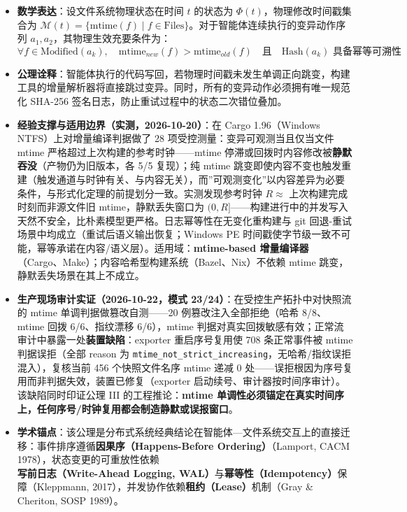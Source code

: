 \begin{itemize}
\tightlist
\item
  \textbf{数学表达}：设文件系统物理状态在时间 \(t\) 的状态为
  \(\Phi(t)\)，物理修改时间戳集合为
  \(\mathcal{M}(t) = \{ \text{mtime}(f) \mid f \in \text{Files} \}\)。对于智能体连续执行的变异动作序列
  \(a_1, a_2\)，其物理生效充要条件为：
  \[ \forall f \in \text{Modified}(a_k), \quad \text{mtime}_{new}(f) > \text{mtime}_{old}(f) \quad \text{且} \quad \text{Hash}(a_k) \text{ 具备幂等可溯性} \]
\item
  \textbf{公理诠释}：智能体执行的代码写回，若物理时间戳未发生单调正向跳变，构建工具的增量解析器将直接跳过变异。同时，所有的变异动作必须拥有唯一规范化
  SHA-256 签名日志，防止重试过程中的状态二次错位叠加。
\item
  \textbf{经验支撑与适用边界（实测，2026-10-20）}：在 Cargo
  1.96（Windows NTFS）上对增量编译判据做了 28
  项受控测量：变异可观测当且仅当文件 mtime
  严格超过上次构建的参考时钟------mtime
  停滞或回拨时内容修改被\textbf{静默吞没}（产物仍为旧版本，各 5/5
  复现）；纯 mtime
  跳变即使内容不变也触发重建（触发通道与时钟有关、与内容无关），而''可观测变化''以内容差异为必要条件，与形式化定理的前提划分一致。实测发现参考时钟
  \(R \approx\) 上次构建完成时刻而非源文件旧 mtime，静默丢失窗口为
  \((0, R]\)------构建进行中的并发写入天然不安全，比朴素模型更严格。日志幂等性在无变化重构建与
  git 回退-重试场景中均成立（重试后语义输出恢复；Windows PE
  时间戳使字节级一致不可能，幂等承诺在内容/语义层）。适用域：\textbf{mtime-based
  增量编译器}（Cargo、Make）；内容哈希型构建系统（Bazel、Nix）不依赖
  mtime 跳变，静默丢失场景在其上不成立。
\item
  \textbf{生产现场审计实证（2026-10-22，模式
  23/24）}：在受控生产拓扑中对快照流的 mtime 单调判据做篡改自测------20
  例篡改注入全部拒绝（哈希 8/8、mtime 回拨 6/6、指纹漂移 6/6），mtime
  判据对真实回拨敏感有效；正常流审计中暴露一处\textbf{装置缺陷}：exporter
  重启序号复用使 708 条正常事件被 mtime 判据误拒（全部 reason 为
  \texttt{mtime\_not\_strict\_increasing}，无哈希/指纹误拒混入），复核当前
  456 个快照文件名序 mtime 递减 0
  处------误拒根因为序号复用而非判据失效，装置已修复（exporter
  启动续号、审计器按时间序审计）。该缺陷同时印证公理 III
  的工程推论：\textbf{mtime
  单调性必须锚定在真实时间序上，任何序号/时钟复用都会制造静默或误报窗口}。
\item
  \textbf{学术锚点}：该公理是分布式系统经典结论在智能体---文件系统交互上的直接迁移：事件排序遵循\textbf{因果序（Happens-Before
  Ordering）}（Lamport, CACM
  1978），状态变更的可重放性依赖\textbf{写前日志（Write-Ahead Logging,
  WAL）}与\textbf{幂等性（Idempotency）}保障（Kleppmann,
  2017），并发协作依赖\textbf{租约（Lease）}机制（Gray \& Cheriton, SOSP
  1989）。
\end{itemize}


